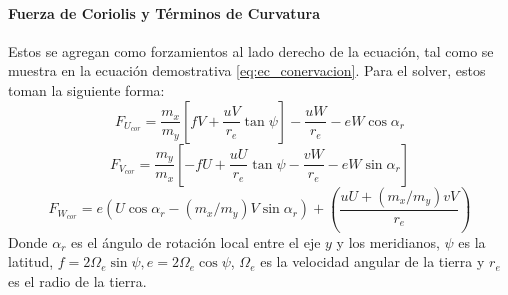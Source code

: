 \paragraph{Fuerza de Coriolis y Términos de Curvatura} Estos se agregan como forzamientos al lado derecho de la ecuación, tal como se muestra en la ecuación demostrativa \ref{eq:ec_conervacion}. Para el solver, estos toman la siguiente forma:
\begin{equation}
F_{U_{cor}} = \frac{m_x}{m_y}\left[ fV + \frac{uV}{r_e}\tan\psi \right] - \frac{uW}{r_e} - eW\cos\alpha_r
\end{equation}
\begin{equation}
F_{V_{cor}} = \frac{m_y}{m_x}\left[ -fU + \frac{uU}{r_e}\tan\psi - \frac{vW}{r_e} - eW\sin\alpha_r \right]
\end{equation}
\begin{equation}
F_{W_{cor}} = e\left( U\cos\alpha_r - (m_x/m_y)V\sin\alpha_r \right) + \left( \frac{uU + (m_x/m_y)vV}{r_e} \right)
\end{equation}
Donde $\alpha_r$ es el ángulo de rotación local entre el eje $y$ y los meridianos, $\psi$ es la latitud, $f=2\Omega_e\sin\psi, e=2\Omega_e\cos\psi$, $\Omega_e$ es la velocidad angular de la tierra y $r_e$ es el radio de la tierra.
